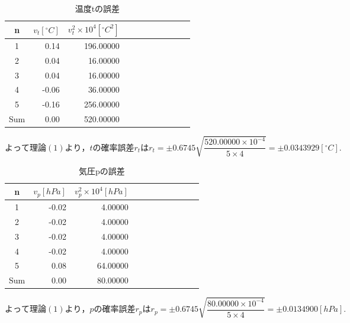 \documentclass[a4paper,1pt]{jsarticle}
\begin{document}
\begin{table}[H]
  \caption{温度tの誤差}
  \label{table:SpeedOfLight}
  \centering
  \begin{tabular}{|c||r|r|r|r|r|r|r|r|r|r|}
    \hline
    n & $v_t[{}^\circ{C}]$ & $v_t^2\times 10^4[{}^\circ{C}^2]$ \\
    \hline\hline
    
    1 & 0.14 & 196.00000 \\
    2 & 0.04 & 16.00000 \\
    3 & 0.04 & 16.00000 \\
    4 & -0.06 & 36.00000 \\
    5 & -0.16 & 256.00000 \\
    

    
    \hline\hline
    Sum & 0.00 & 520.00000 \\
    \hline
  \end{tabular}


\end{table}

$よって理論(1)より，tの確率誤差r_tはr_t=\pm0.6745\sqrt{\dfrac{520.00000\times 10^{-4}}{5\times 4}}=\pm0.0343929[{}^\circ{C}].$\\

\begin{table}[H]
  \caption{気圧pの誤差}
  \label{table:SpeedOfLight}
  \centering
  \begin{tabular}{|c||r|r|r|r|r|r|r|r|r|r|}
    \hline
    n & $v_p[hPa]$ & $v_p^2\times 10^4[hPa]$ \\
    \hline\hline
    
    1 & -0.02 & 4.00000 \\
    2 & -0.02 & 4.00000 \\
    3 & -0.02 & 4.00000 \\
    4 & -0.02 & 4.00000 \\
    5 & 0.08 & 64.00000 \\
    

    

   
    
    \hline\hline
    Sum & 0.00 & 80.00000 \\
    \hline
  \end{tabular}


\end{table}

$よって理論(1)より，pの確率誤差r_pはr_p=\pm0.6745\sqrt{\dfrac{80.00000\times 10^{-4}}{5\times 4}}=\pm0.0134900[hPa].$\\
\end{document}
